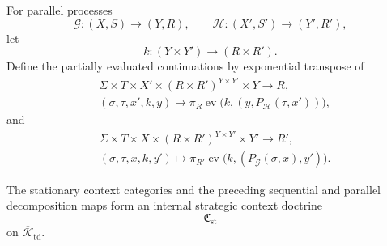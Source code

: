 For parallel processes
\[
  \mathcal G:(X,S)\to(Y,R),
  \qquad
  \mathcal H:(X',S')\to(Y',R'),
\]
let
\[
  k:(Y\times Y')\to(R\times R').
\]
Define the partially evaluated continuations by exponential transpose of
\[
\begin{aligned}
  &\Sigma\times T\times X'\times(R\times R')^{Y\times Y'}\times Y
  \longrightarrow R,
  \\
  &(\sigma,\tau,x',k,y)
  \longmapsto
  \pi_R
  \operatorname{ev}
  \bigl(
    k,
    (y,P_{\mathcal H}(\tau,x'))
  \bigr),
\end{aligned}
\]
and
\[
\begin{aligned}
  &\Sigma\times T\times X\times(R\times R')^{Y\times Y'}\times Y'
  \longrightarrow R',
  \\
  &(\sigma,\tau,x,k,y')
  \longmapsto
  \pi_{R'}
  \operatorname{ev}
  \bigl(
    k,
    (P_{\mathcal G}(\sigma,x),y')
  \bigr).
\end{aligned}
\]

\begin{proposition}
\label{prop:stationary-context-doctrine}
The stationary context categories and the preceding sequential and parallel decomposition maps form
an internal strategic context doctrine
\[
  \mathfrak C_{\mathrm{st}}
\]
on \(\overline{\mathcal K}_{\mathrm{td}}\).
\end{proposition}

